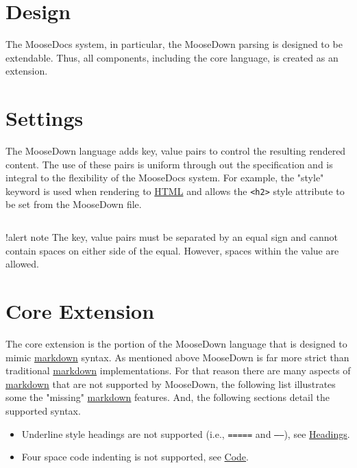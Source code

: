 \documentclass{book}
\begin{document}
\section{\label{design}Design}
\par
The MooseDocs system, in particular, the MooseDown parsing is designed to be extendable. Thus, all components, including the core language, is created as an extension.
\section{\label{settings}Settings}
\par
The MooseDown language adds key, value pairs to control the resulting rendered content. The use of these pairs is uniform through out the specification and is integral to the flexibility of the MooseDocs system. For example, the "style" keyword is used when rendering to \href{https://en.wikipedia.org/wiki/HTML}{HTML} and allows the \texttt{\textless h2\textgreater } style attribute to be set from the MooseDown file.
\begin{verbatim}
\end{verbatim}
\par
!alert note The key, value pairs must be separated by an equal sign and cannot contain spaces on either side of the equal. However, spaces within the value are allowed.
\section{\label{core-extension}Core Extension}
\par
The core extension is the portion of the MooseDown language that is designed to mimic \href{https://en.wikipedia.org/wiki/Markdown}{markdown} syntax. As mentioned above MooseDown is far more strict than traditional \href{https://en.wikipedia.org/wiki/Markdown}{markdown} implementations. For that reason there are many aspects of \href{https://en.wikipedia.org/wiki/Markdown}{markdown} that are not supported by MooseDown, the following list illustrates some the "missing" \href{https://en.wikipedia.org/wiki/Markdown}{markdown} features. And, the following sections detail the supported syntax.
\begin{itemize}
\item
\par
Underline style headings are not supported (i.e., \texttt{=====} and \texttt{-----}), see \href{headings}{Headings}. 
\item
\par
Four space code indenting is not supported, see \href{code}{Code}.
\end{itemize}
\end{document}
